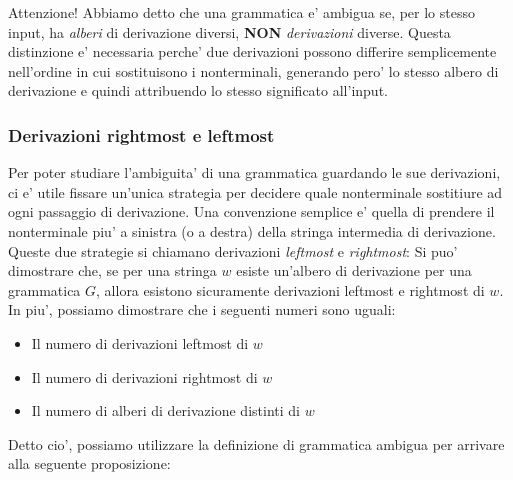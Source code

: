 Attenzione! Abbiamo detto che una grammatica e' ambigua se, per lo stesso input, ha \textit{alberi} di derivazione diversi, \textbf{NON} \textit{derivazioni} diverse. Questa distinzione e' necessaria perche' due derivazioni possono differire semplicemente nell'ordine in cui sostituisono i nonterminali, generando pero' lo stesso albero di derivazione e quindi attribuendo lo stesso significato all'input. 

\subsubsection{Derivazioni rightmost e leftmost} 
Per poter studiare l'ambiguita' di una grammatica guardando le sue derivazioni, ci e' utile fissare un'unica strategia per decidere quale nonterminale sostitiure ad ogni passaggio di derivazione. Una convenzione semplice e' quella di prendere il nonterminale piu' a sinistra (o a destra) della stringa intermedia di derivazione. Queste due strategie si chiamano derivazioni \textit{leftmost} e \textit{rightmost}:
\label{dfn: derLeft}
Si puo' dimostrare che, se per una stringa $ w $ esiste un'albero di derivazione per una grammatica $ G $, allora esistono sicuramente derivazioni leftmost e rightmost di $ w $. In piu', possiamo dimostrare che i seguenti numeri sono uguali:
\begin{itemize}
  \item Il numero di derivazioni leftmost di $ w $
  \item Il numero di derivazioni rightmost di $ w $
  \item Il numero di alberi di derivazione distinti di $ w $
\end{itemize}

Detto cio', possiamo utilizzare la definizione di grammatica ambigua per arrivare alla seguente proposizione:

